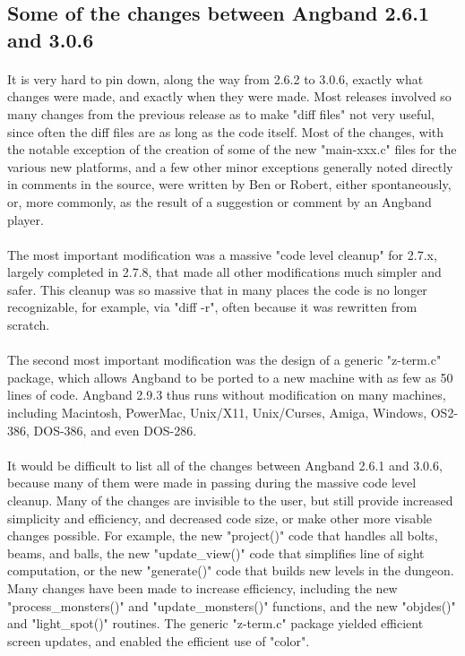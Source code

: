 \subsection{Some of the changes between Angband 2.6.1 and 3.0.6}

\paragraph{}It is very hard to pin down, along the way from 2.6.2 to 3.0.6, exactly what
changes were made, and exactly when they were made. Most releases involved 
so many changes from the previous release as to make "diff files" not very 
useful, since often the diff files are as long as the code itself. Most of 
the changes, with the notable exception of the creation of some of the new 
"main-xxx.c" files for the various new platforms, and a few other minor 
exceptions generally noted directly in comments in the source, were written 
by Ben or Robert, either spontaneously, or, more commonly, as the result of 
a suggestion or comment by an Angband player.

\paragraph{}The most important modification was a massive "code level cleanup" for 2.7.x, 
largely completed in 2.7.8, that made all other modifications much simpler 
and safer.  This cleanup was so massive that in many places the code is no 
longer recognizable, for example, via "diff -r", often because it was 
rewritten from scratch.

\paragraph{}The second most important modification was the design of a generic "z-term.c"
package, which allows Angband to be ported to a new machine with as few as 50
lines of code.  Angband 2.9.3 thus runs without modification on many machines,
including Macintosh, PowerMac, Unix/X11, Unix/Curses, Amiga, Windows, OS2-386,
DOS-386, and even DOS-286.

\paragraph{}It would be difficult to list all of the changes between Angband 2.6.1 and
3.0.6, because many of them were made in passing during the massive code 
level cleanup.  Many of the changes are invisible to the user, but still 
provide increased simplicity and efficiency, and decreased code size, or 
make other more visable changes possible.  For example, the new "project()" 
code that handles all bolts, beams, and balls, the new "update\_view()" code 
that simplifies line of sight computation, or the new "generate()" code that 
builds new levels in the dungeon.  Many changes have been made to increase 
efficiency, including the new "process\_monsters()" and "update\_monsters()" 
functions, and the new "objdes()" and "light\_spot()" routines.  The generic 
"z-term.c" package yielded efficient screen updates, and enabled the 
efficient use of "color". 

